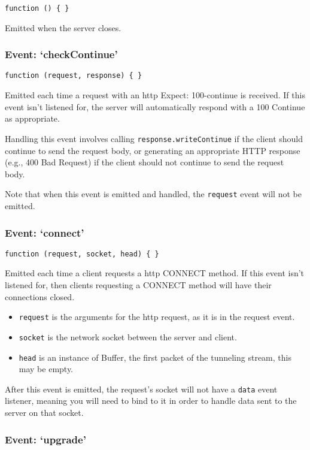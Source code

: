 \texttt{function () \{ \}}

Emitted when the server closes.

\subsubsection{Event: `checkContinue'}

\texttt{function (request, response) \{ \}}

Emitted each time a request with an http Expect: 100-continue is
received. If this event isn't listened for, the server will
automatically respond with a 100 Continue as appropriate.

Handling this event involves calling \texttt{response.writeContinue} if
the client should continue to send the request body, or generating an
appropriate HTTP response (e.g., 400 Bad Request) if the client should
not continue to send the request body.

Note that when this event is emitted and handled, the \texttt{request}
event will not be emitted.

\subsubsection{Event: `connect'}

\texttt{function (request, socket, head) \{ \}}

Emitted each time a client requests a http CONNECT method. If this event
isn't listened for, then clients requesting a CONNECT method will have
their connections closed.

\begin{itemize}
\item
  \texttt{request} is the arguments for the http request, as it is in
  the request event.
\item
  \texttt{socket} is the network socket between the server and client.
\item
  \texttt{head} is an instance of Buffer, the first packet of the
  tunneling stream, this may be empty.
\end{itemize}

After this event is emitted, the request's socket will not have a
\texttt{data} event listener, meaning you will need to bind to it in
order to handle data sent to the server on that socket.

\subsubsection{Event: `upgrade'}

